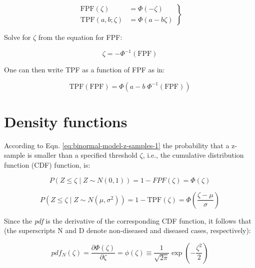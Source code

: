 \documentclass[
]{book}
\begin{document}
\begin{equation}
\left.
\begin{aligned}
\text{FPF}\left ( \zeta \right ) &= \Phi\left ( -\zeta \right )\\
\text{TPF}\left (a,b; \zeta \right ) &= \Phi\left ( a - b \zeta \right )
\end{aligned}
\right \}
\label{eq:binormal-model-op-point-ab}
\end{equation}

Solve for \(\zeta\) from the equation for FPF:

\begin{equation}
\zeta = - \Phi^{-1}\left ( \text{FPF} \right )
\label{eq:binormal-model-op-point-ab1}
\end{equation}

One can then write TPF as a function of FPF as in:

\begin{equation}
\text{TPF}\left (\text{FPF} \right ) = \Phi\left ( a - b \; \Phi^{-1}\left ( \text{FPF} \right ) \right ) 
\label{eq:binormal-model-op-point-ab2}
\end{equation}

\hypertarget{binormal-model-pdfs}{%
\section{Density functions}\label{binormal-model-pdfs}}

According to Eqn. \eqref{eq:binormal-model-z-samples-1} the probability that a z-sample is smaller than a specified threshold \(\zeta\), i.e., the cumulative distribution function (CDF) function, is:

\begin{equation*} 
P\left ( Z \le \zeta \mid  Z\sim N\left ( 0,1 \right ) \right ) = 1-FPF\left ( \zeta \right ) = \Phi \left ( \zeta  \right )
\end{equation*}

\begin{equation*} 
P\left ( Z \le \zeta \mid  Z\sim N\left ( \mu,\sigma^2 \right ) \right ) = 1-\text{TPF}\left ( \zeta \right ) = \Phi \left ( \frac{\zeta - \mu}{\sigma}  \right )
\end{equation*}

Since the \emph{pdf} is the derivative of the corresponding CDF function, it follows that (the superscripts N and D denote non-diseased and diseased cases, respectively):

\begin{equation*} 
pdf_N\left ( \zeta \right ) = \frac{\partial \Phi\left ( \zeta \right )}{\partial \zeta} = \phi\left ( \zeta \right ) \equiv \frac{1}{\sqrt{2 \pi}}\exp\left ( -\frac{\zeta^2}{2} \right )
\end{equation*}
\end{document}
